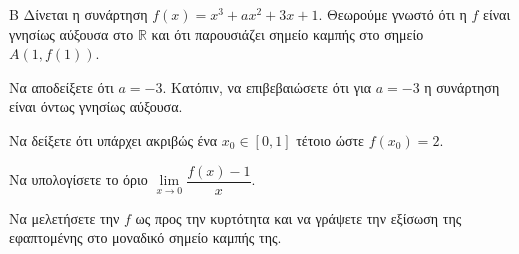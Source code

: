 \begin{thema}{Β}
Δίνεται η συνάρτηση $f(x) = x^3 + a x^2 + 3x + 1$. Θεωρούμε γνωστό ότι η $f$ είναι γνησίως αύξουσα στο $\mathbb{R}$ και ότι παρουσιάζει σημείο καμπής στο σημείο $A(1, f(1))$.
\begin{erwthma}
  \item Να αποδείξετε ότι $a=-3$. Κατόπιν, να επιβεβαιώσετε ότι για $a=-3$ η συνάρτηση είναι όντως γνησίως αύξουσα.
  \item Να δείξετε ότι υπάρχει ακριβώς ένα $x_0 \in [0, 1]$ τέτοιο ώστε $f(x_0)=2$.
  \item Να υπολογίσετε το όριο $\lim\limits_{x \to 0} \dfrac{f(x)-1}{x}$.
  \item Να μελετήσετε την $f$ ως προς την κυρτότητα και να γράψετε την εξίσωση της εφαπτομένης στο μοναδικό σημείο καμπής της.
\end{erwthma}
\end{thema}
